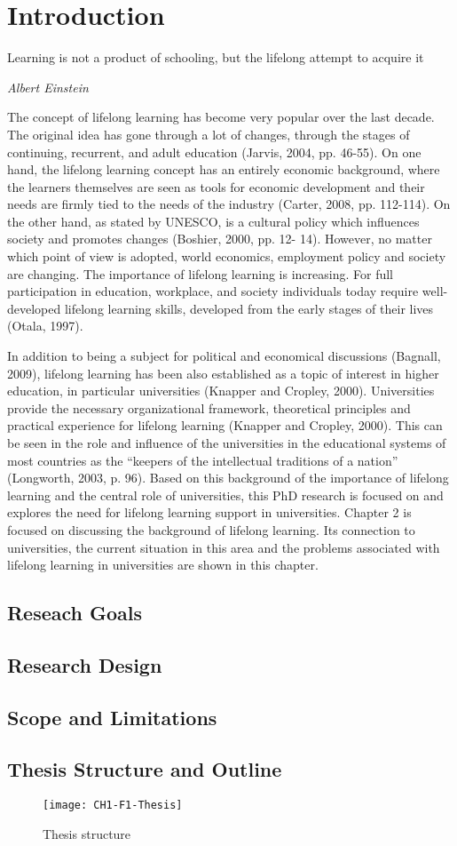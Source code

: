 \chapter{Introduction\label{cha:intro}}
\epigraph{Learning is not a product of schooling, but the lifelong attempt to
acquire it}{\textit{Albert Einstein}}
\noindent
The concept of lifelong learning has become very popular over the last decade.
The original idea has gone through a lot of changes, through the stages of
continuing, recurrent, and adult education (Jarvis, 2004, pp. 46-55). On one
hand, the lifelong learning concept has an entirely economic background, where
the learners themselves are seen as tools for economic development and their
needs are firmly tied to the needs of the industry (Carter, 2008, pp. 112-114).
On the other hand, as stated by UNESCO, \LLLs is a
cultural policy which influences society and promotes changes (Boshier, 2000, pp. 12-
14). However, no matter which point of view is adopted, world economics, employment
policy and society are changing. The importance of lifelong learning is increasing. For
full participation in education, workplace, and society individuals today require well-
developed lifelong learning skills, developed from the early stages of their lives (Otala,
1997).

In addition to being a subject for political and economical discussions (Bagnall, 2009),
lifelong learning has been also established as a topic of interest in higher education, in
particular universities (Knapper and Cropley, 2000). Universities provide the
necessary organizational framework, theoretical principles and practical experience for lifelong
learning (Knapper and Cropley, 2000). This can be seen in the role and influence
of the universities in the educational systems of most countries as the “keepers of the
intellectual traditions of a nation” (Longworth, 2003, p. 96). Based on this background of
the importance of lifelong learning and the central role of universities, this PhD research
is focused on and explores the need for lifelong learning support in
universities. Chapter 2 is focused on discussing the background of lifelong learning. Its connection to universities, the current situation in this area and the problems associated with lifelong
learning in universities are shown in this chapter. 


\section{Reseach Goals}

\section{Research Design}

\section{Scope and Limitations}

\section{Thesis Structure and Outline}

\begin{figure}[htb]
\centering
\texttt{[image: CH1-F1-Thesis]}
\caption{Thesis structure}
\label{fig:ts}
\end{figure}
